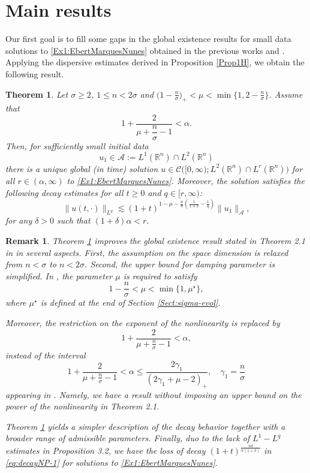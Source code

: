 \documentclass[10pt]{article}
\newtheorem{theorem}{Theorem}[section]
\newtheorem{remark}{Remark}[section]
\newcommand{\<}{\langle}
\renewcommand{\>}{\rangle}
\numberwithin{equation}{section}
\begin{document}
\section{Main results} \label{Sec:Main-Results}
Our first goal is to fill some gaps in the global existence results for small data solutions to \eqref{Ex1:EbertMarquesNunes} obtained in the previous works \cite{Ebert-L} and \cite{Ebert-Marques-Nunes=2024}. Applying the dispersive estimates derived in Proposition \ref{Prop1H}, we obtain the following result.
\begin{theorem}\label{thm:Nonlinear-plate-1}
Let $\sigma\geq 2$, $1\leq n<2\sigma$ and $\big(1-\frac{n}{\sigma}\big)_+<\mu<\min\big\{ 1, 2-\frac{n}{\sigma} \big\}$. Assume that
\[ 1+\frac{2}{\mu+\dfrac{n}{\sigma}-1}<\alpha. \]
Then, for sufficiently small initial data
\[ u_1\in \mathcal A:=L^1(\mathbb R^n)\cap L^2(\mathbb R^n) \]
there is a unique global (in time) solution $u\in \mathcal{C}\big([0,\infty);L^2(\mathbb R^n)\cap L^r(\mathbb R^n)\big)$ for all $r\in (\alpha,\infty)$ to \eqref{Ex1:EbertMarquesNunes}.
Moreover, the solution satisfies the following decay estimates for all $t\geq 0$ and $q\in[r,\infty)$:
\begin{equation}\label{eq:decayNP-1}
\|u(t,\cdot)\|_{L^q} \lesssim (1+t)^{1-\mu-\frac{n}{\sigma}\left(\frac{1}{1+\delta}-\frac{1}{q} \right)} \|u_1\|_{\mathcal A},
\end{equation}
 for any $\delta>0$ such that $(1+\delta)\alpha<r$.
\end{theorem}
\begin{remark}
Theorem \ref{thm:Nonlinear-plate-1} improves the global existence result stated in Theorem 2.1 in \cite{Ebert-Marques-Nunes=2024} in several aspects. First, the assumption on the space dimension is relaxed from $n<\sigma$ to $n< 2\sigma$. Second, the upper bound for damping parameter is simplified. In \cite{Ebert-Marques-Nunes=2024}, the parameter $\mu$ is required to satisfy
\[ 1-\frac{n}{\sigma}<\mu<\min\{1,\mu^\star\}, \]
where $\mu^\star$ is defined at the end of Section \ref{Sect:sigma-evol}.

Moreover, the restriction on the exponent of the nonlinearity is replaced by
\[ 1+\frac{2}{\mu+\frac{n}{\sigma}-1}<\alpha, \]
instead of the interval
\[ 1+\frac{2}{\mu+\frac{n}{\sigma}-1}<\alpha \leq \frac{2\gamma_1}{(2\gamma_1+\mu-2)_+}, \quad \gamma_1=\frac{n}{\sigma} \]
appearing in \cite{Ebert-Marques-Nunes=2024}. Namely, we have a result without imposing an upper bound on the power of the nonlinearity in Theorem 2.1.

Theorem \ref{thm:Nonlinear-plate-1} yields a simpler description of the decay behavior together with a broader range of admissible parameters. Finally, duo to the lack of $L^1-L^q$ estimates in Proposition 3.2, we have the loss  of decay  $(1+t)^{\frac{n\delta}{\sigma(1+\delta)}}$  in \eqref{eq:decayNP-1}  for solutions to \eqref{Ex1:EbertMarquesNunes}.
\end{remark}
\end{document}
